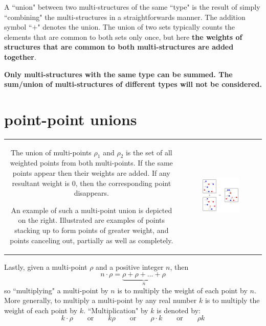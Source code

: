 \documentclass{book}
\begin{document}
A ``union" between two multi-structures of the same ``type" is the result of simply ``combining" the multi-structures in a straightforwards manner. The addition symbol ``\(+\)" denotes the union. The union of two sets typically counts the elements that are common to both sets only once, but here {\bf the weights of structures that are common to both multi-structures are added together}. 

{\bf Only multi-structures with the same type can be summed. The sum/union of multi-structures of different types will not be considered.} 


\section{point-point unions}

\vspace{5mm}

\begin{tabular}{cc}
\parbox{0.5\textwidth}{
The union of multi-points \(\rho_1\) and \(\rho_2\) is the set of all weighted points from both multi-points. If the same points appear then their weights are added. If any resultant weight is \(0\), then the corresponding point disappears.  

An example of such a multi-point union is depicted on the right. Illustrated are examples of points stacking up to form points of greater weight, and points canceling out, partially as well as completely. 
} & \parbox{0.5\textwidth}{
\includegraphics[width = 0.5\textwidth]{Unions/multipoint_unions}
}
\end{tabular}

Lastly, given a multi-point \(\rho\) and a positive integer \(n\), then
\[n \cdot \rho = \underbrace{\rho + \rho + ... + \rho}_n\]
so ``multiplying" a multi-point by \(n\) is to multiply the weight of each point by \(n\). More generally, to multiply a multi-point by any real number \(k\) is to multiply the weight of each point by \(k\). ``Multiplication" by \(k\) is denoted by:
\[k \cdot \rho \quad\quad\text{or}\quad\quad k\rho \quad\quad\text{or}\quad\quad \rho \cdot k \quad\quad\text{or}\quad\quad \rho k\]
\end{document}
